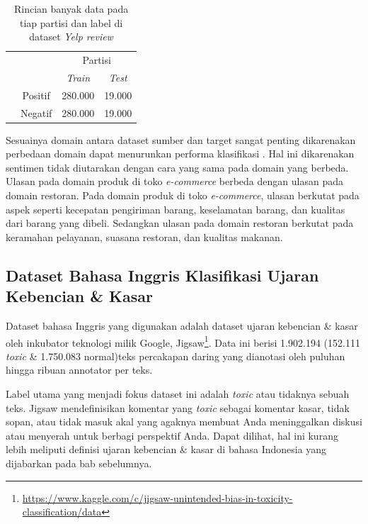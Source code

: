 	\begin{table}[ht]
	    \centering
	    \caption{Rincian banyak data pada tiap partisi dan label di dataset \textit{Yelp review}}
	    \begin{tabular}{@{}cc|cc@{}}
			\multicolumn{1}{c}{} &\multicolumn{1}{c}{} &\multicolumn{2}{c}{Partisi} \\ 
			\multicolumn{1}{c}{} & 
			\multicolumn{1}{c|}{} & 
			\multicolumn{1}{c}{\textit{Train}} & 
			\multicolumn{1}{c}{\textit{Test}} \\ 
			\cline{2-4}
			\multirow[c]{2}{*}{\rotatebox[origin=tr]{90}{Label}}
			& Positif  & 280.000 & 19.000   \\[1.5ex]
			& Negatif  & 280.000 & 19.000   \\ 
			\cline{2-4}
	    \end{tabular}
	    \label{tab:detail_yelp_review}
	\end{table}

	Sesuainya domain antara dataset sumber dan target sangat penting dikarenakan perbedaan domain dapat menurunkan performa klasifikasi \parencite{Lai_Oguz_Yang_Stoyanov_2019}. Hal ini dikarenakan sentimen tidak diutarakan dengan cara yang sama pada domain yang berbeda. Ulasan pada domain produk di toko \textit{e-commerce} berbeda dengan ulasan pada domain restoran. Pada domain produk di toko \textit{e-commerce}, ulasan berkutat pada aspek seperti kecepatan pengiriman barang, keselamatan barang, dan kualitas dari barang yang dibeli. Sedangkan ulasan pada domain restoran berkutat pada keramahan pelayanan, suasana restoran, dan kualitas makanan.
	
	\subsection{Dataset Bahasa Inggris Klasifikasi Ujaran Kebencian \& Kasar}
	Dataset bahasa Inggris yang digunakan adalah dataset ujaran kebencian \& kasar oleh inkubator teknologi milik Google, Jigsaw\footnote{\url{https://www.kaggle.com/c/jigsaw-unintended-bias-in-toxicity-classification/data}}. Data ini berisi 1.902.194 (152.111 \textit{toxic} \& 1.750.083 normal)teks percakapan daring yang dianotasi oleh puluhan hingga ribuan annotator per teks. 

	Label utama yang menjadi fokus dataset ini adalah \textit{toxic} atau tidaknya sebuah teks. Jigsaw mendefinisikan komentar yang \textit{toxic} sebagai komentar kasar, tidak sopan, atau tidak masuk akal yang agaknya membuat Anda meninggalkan diskusi atau menyerah untuk berbagi perspektif Anda. Dapat dilihat, hal ini kurang lebih meliputi definisi ujaran kebencian \& kasar di bahasa Indonesia yang dijabarkan pada bab sebelumnya.

